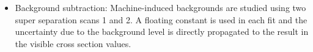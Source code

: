 \begin{itemize}


\item Background subtraction: %
  Machine-induced backgrounds are studied using two super separation scans 1 and 2. A floating constant is used in each fit and the uncertainty due to the background level is directly propagated to the result in the visible cross section values.

\end{itemize}
